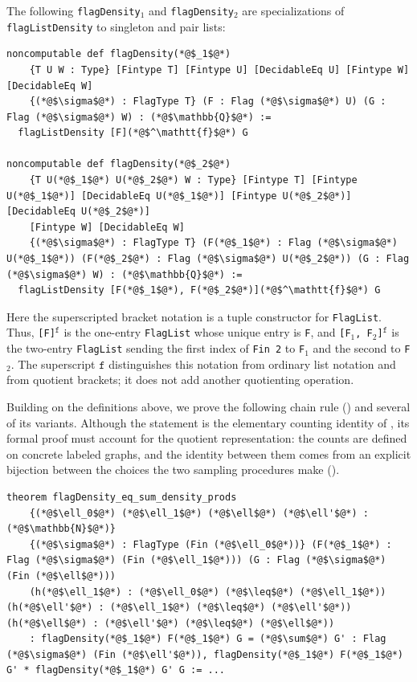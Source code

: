 \documentclass{article}
\newcommand{\lean}[1]{\texttt{#1}}
\begin{document}
The following \lean{flagDensity}$_1$ and \lean{flagDensity}$_2$ are specializations of \lean{flagListDensity}
to singleton and pair lists:
\begin{lstlisting}
noncomputable def flagDensity(*@$_1$@*)
    {T U W : Type} [Fintype T] [Fintype U] [DecidableEq U] [Fintype W] [DecidableEq W]
    {(*@$\sigma$@*) : FlagType T} (F : Flag (*@$\sigma$@*) U) (G : Flag (*@$\sigma$@*) W) : (*@$\mathbb{Q}$@*) :=
  flagListDensity [F](*@$^\mathtt{f}$@*) G

noncomputable def flagDensity(*@$_2$@*)
    {T U(*@$_1$@*) U(*@$_2$@*) W : Type} [Fintype T] [Fintype U(*@$_1$@*)] [DecidableEq U(*@$_1$@*)] [Fintype U(*@$_2$@*)] [DecidableEq U(*@$_2$@*)]
    [Fintype W] [DecidableEq W]
    {(*@$\sigma$@*) : FlagType T} (F(*@$_1$@*) : Flag (*@$\sigma$@*) U(*@$_1$@*)) (F(*@$_2$@*) : Flag (*@$\sigma$@*) U(*@$_2$@*)) (G : Flag (*@$\sigma$@*) W) : (*@$\mathbb{Q}$@*) :=
  flagListDensity [F(*@$_1$@*), F(*@$_2$@*)](*@$^\mathtt{f}$@*) G
\end{lstlisting}
Here the superscripted bracket notation is a tuple constructor for
\lean{FlagList}.  Thus, \lean{[F]}$^{\mathtt{f}}$ is the one-entry
\lean{FlagList} whose unique entry is \lean{F}, and
\lean{[F}$_1$\lean{, F}$_2$\lean{]}$^{\mathtt{f}}$ is the two-entry
\lean{FlagList} sending the first index of \lean{Fin~2} to \lean{F}$_1$ and
the second to \lean{F}$_2$.  The superscript \(\mathtt{f}\) distinguishes this
notation from ordinary list notation and from quotient brackets; it does not
add another quotienting operation.

Building on the definitions above, we prove the following chain rule
() and several of its variants.
Although the statement is the elementary counting identity of
, its formal proof must account for the quotient
representation:
the counts are defined on concrete labeled graphs, and the identity between
them comes from an explicit bijection between the choices the two sampling
procedures make ().
\begin{lstlisting}
theorem flagDensity_eq_sum_density_prods
    {(*@$\ell_0$@*) (*@$\ell_1$@*) (*@$\ell$@*) (*@$\ell'$@*) : (*@$\mathbb{N}$@*)}
    {(*@$\sigma$@*) : FlagType (Fin (*@$\ell_0$@*))} (F(*@$_1$@*) : Flag (*@$\sigma$@*) (Fin (*@$\ell_1$@*))) (G : Flag (*@$\sigma$@*) (Fin (*@$\ell$@*)))
    (h(*@$\ell_1$@*) : (*@$\ell_0$@*) (*@$\leq$@*) (*@$\ell_1$@*)) (h(*@$\ell'$@*) : (*@$\ell_1$@*) (*@$\leq$@*) (*@$\ell'$@*)) (h(*@$\ell$@*) : (*@$\ell'$@*) (*@$\leq$@*) (*@$\ell$@*))
    : flagDensity(*@$_1$@*) F(*@$_1$@*) G = (*@$\sum$@*) G' : Flag (*@$\sigma$@*) (Fin (*@$\ell'$@*)), flagDensity(*@$_1$@*) F(*@$_1$@*) G' * flagDensity(*@$_1$@*) G' G := ...
\end{lstlisting}
\end{document}
